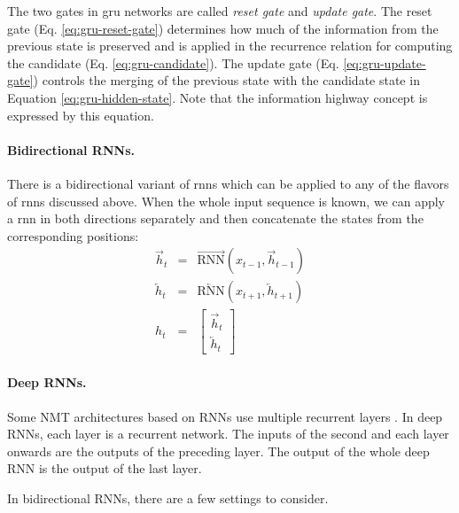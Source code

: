 The two gates in \gls{gru} networks are called \emph{reset gate} and
\emph{update gate}.  The reset gate (Eq. \ref{eq:gru-reset-gate}) determines how
much of the information from the previous state is preserved and is applied in
the recurrence relation for computing the candidate
(Eq. \ref{eq:gru-candidate}). The update gate (Eq.  \ref{eq:gru-update-gate})
controls the merging of the previous state with the candidate state in Equation
\ref{eq:gru-hidden-state}. Note that the information highway concept is
expressed by this equation.

\paragraph{Bidirectional RNNs.} There is a bidirectional variant of \glspl{rnn}
which can be applied to any of the flavors of \glspl{rnn} discussed above. When
the whole input sequence is known, we can apply a \gls{rnn} in both directions
separately and then concatenate the states from the corresponding positions:
%
\begin{eqnarray} \overrightarrow{h}_t & = &
\overrightarrow{\mathrm{RNN}}(x_{t-1}, \overrightarrow{h}_{t-1}) \\
\overleftarrow{h}_t & = & \overleftarrow{\mathrm{RNN}}(x_{t+1},
\overleftarrow{h}_{t+1}) \\ h_t & = & \left[ \begin{matrix} \overrightarrow{h}_t
\\ \overleftarrow{h}_t
\end{matrix} \right]
\end{eqnarray}


\paragraph{Deep RNNs.} Some NMT architectures based on RNNs use multiple
recurrent layers \citep{barone2017deep,wu2016google}. In deep RNNs, each layer
is a recurrent network. The inputs of the second and each layer onwards are the
outputs of the preceding layer. The output of the whole deep RNN is the output
of the last layer.

In bidirectional RNNs, there are a few settings to consider. 

